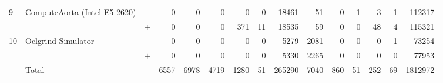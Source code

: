 \begin{tabular}{lll | rrrrrr | rrrrrr }
\hline
\multirow{ 2}{*}{9} & \multirow{ 2}{*}{ComputeAorta (Intel E5-2620)} & $-$ & 0 & 0 & 0 & 0 & 0 & 18461       & 51 & 0 & 1 & 3 & 1 & 112317 \\& & $+$ & 0 & 0 & 0 & 371 & 11 & 18535 & 59 & 0 & 0 & 48 & 4 & 115321 \\
\hline
\multirow{ 2}{*}{10} & \multirow{ 2}{*}{Oclgrind Simulator} & $-$ & 0 & 0 & 0 & 0 & 0 & 5279       & 2081 & 0 & 0 & 0 & 1 & 73254 \\& & $+$ & 0 & 0 & 0 & 0 & 0 & 5330 & 2265 & 0 & 0 & 0 & 0 & 77953 \\
  \midrule
  
\multirow{ 2}{*}{} & \multirow{ 2}{*}{Total} & \multirow{ 2}{*}{} &
\multirow{ 2}{*}{6557} & \multirow{ 2}{*}{6978} & \multirow{ 2}{*}{4719} & \multirow{ 2}{*}{1280} & \multirow{ 2}{*}{51} & \multirow{ 2}{*}{265290} & \multirow{ 2}{*}{7040} & \multirow{ 2}{*}{860} & \multirow{ 2}{*}{51} & \multirow{ 2}{*}{252} & \multirow{ 2}{*}{69} & \multirow{ 2}{*}{1812972} \\
\\

  \bottomrule
\end{tabular}

